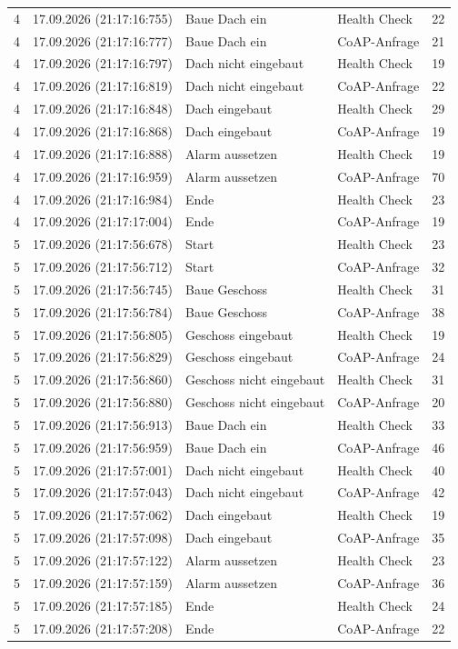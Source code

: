 {\begin{longtable}{|c|l|>{\raggedright\arraybackslash}p{4.2cm}|l|r|}
4 & 17.09.2026 (21:17:16:755) & Baue Dach ein & Health Check & 22 \\
4 & 17.09.2026 (21:17:16:777) & Baue Dach ein & CoAP-Anfrage & 21 \\
4 & 17.09.2026 (21:17:16:797) & Dach nicht eingebaut & Health Check & 19 \\
4 & 17.09.2026 (21:17:16:819) & Dach nicht eingebaut & CoAP-Anfrage & 22 \\
4 & 17.09.2026 (21:17:16:848) & Dach eingebaut & Health Check & 29 \\
4 & 17.09.2026 (21:17:16:868) & Dach eingebaut & CoAP-Anfrage & 19 \\
4 & 17.09.2026 (21:17:16:888) & Alarm aussetzen & Health Check & 19 \\
4 & 17.09.2026 (21:17:16:959) & Alarm aussetzen & CoAP-Anfrage & 70 \\
4 & 17.09.2026 (21:17:16:984) & Ende & Health Check & 23 \\
4 & 17.09.2026 (21:17:17:004) & Ende & CoAP-Anfrage & 19 \\
5 & 17.09.2026 (21:17:56:678) & Start & Health Check & 23 \\
5 & 17.09.2026 (21:17:56:712) & Start & CoAP-Anfrage & 32 \\
5 & 17.09.2026 (21:17:56:745) & Baue Geschoss & Health Check & 31 \\
5 & 17.09.2026 (21:17:56:784) & Baue Geschoss & CoAP-Anfrage & 38 \\
5 & 17.09.2026 (21:17:56:805) & Geschoss eingebaut & Health Check & 19 \\
5 & 17.09.2026 (21:17:56:829) & Geschoss eingebaut & CoAP-Anfrage & 24 \\
5 & 17.09.2026 (21:17:56:860) & Geschoss nicht eingebaut & Health Check & 31 \\
5 & 17.09.2026 (21:17:56:880) & Geschoss nicht eingebaut & CoAP-Anfrage & 20 \\
5 & 17.09.2026 (21:17:56:913) & Baue Dach ein & Health Check & 33 \\
5 & 17.09.2026 (21:17:56:959) & Baue Dach ein & CoAP-Anfrage & 46 \\
5 & 17.09.2026 (21:17:57:001) & Dach nicht eingebaut & Health Check & 40 \\
5 & 17.09.2026 (21:17:57:043) & Dach nicht eingebaut & CoAP-Anfrage & 42 \\
5 & 17.09.2026 (21:17:57:062) & Dach eingebaut & Health Check & 19 \\
5 & 17.09.2026 (21:17:57:098) & Dach eingebaut & CoAP-Anfrage & 35 \\
5 & 17.09.2026 (21:17:57:122) & Alarm aussetzen & Health Check & 23 \\
5 & 17.09.2026 (21:17:57:159) & Alarm aussetzen & CoAP-Anfrage & 36 \\
5 & 17.09.2026 (21:17:57:185) & Ende & Health Check & 24 \\
5 & 17.09.2026 (21:17:57:208) & Ende & CoAP-Anfrage & 22 \\
\end{longtable}
}
